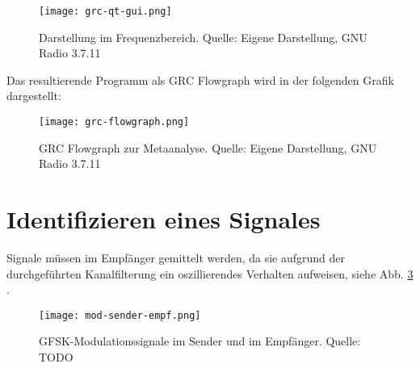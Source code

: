\begin{figure}[ht]
	\centering
	\texttt{[image: grc-qt-gui.png]}
	\caption[Darstellung im Frequenzbereich]{Darstellung im Frequenzbereich. Quelle: Eigene Darstellung, GNU Radio 3.7.11} 
	\label{grc-qt-gui}
\end{figure}



Das resultierende Programm als GRC Flowgraph wird in der folgenden Grafik dargestellt:
\begin{figure}[H]
	\centering
	\texttt{[image: grc-flowgraph.png]}
	\caption[GRC Flowgraph zur Metaanalyse]{GRC Flowgraph zur Metaanalyse. Quelle: Eigene Darstellung, GNU Radio 3.7.11} 
	\label{grc-flowgraph}
\end{figure}

\section{Identifizieren eines Signales}
Signale müssen im Empfänger gemittelt werden, da sie aufgrund der durchgeführten Kanalfilterung ein oszillierendes Verhalten aufweisen, siehe Abb. \ref{mod-send-empf} \cite[vgl. Heuberger, e. a., S. TODO]{Heuberger:2017}.

\begin{figure}[ht]
	\centering
	\texttt{[image: mod-sender-empf.png]}
	\caption[GFSK-Modulationssignale im Sender und im Empfänger]{GFSK-Modulationssignale im Sender und im Empfänger. Quelle: TODO} %
	\label{mod-send-empf}
\end{figure}


\newpage

